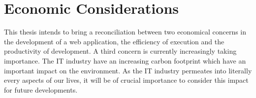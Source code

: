 \section{Economic Considerations}

This thesis intends to bring a reconciliation between two economical concerns in the development of a web application, the efficiency of execution and the productivity of development.
A third concern is currently increasingly taking importance.
The IT industry have an increasing carbon footprint which have an important impact on the environment.
As the IT industry permeates into literally every aspects of our lives, it will be of crucial importance to consider this impact for future developments.
